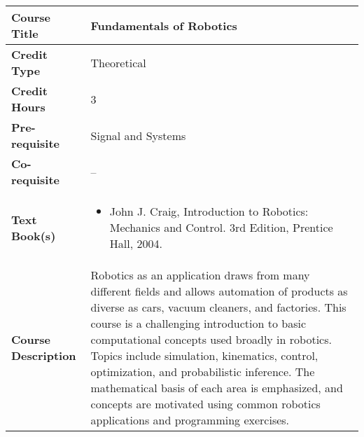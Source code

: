 \documentclass[11pt]{article}
\begin{document}
\begin{table}[h!]
\begin{tabular}{|l|l|}
\hline
\textbf{Course Title}       &  Fundamentals of Robotics \\ \hline
\textbf{Credit Type}        &  Theoretical \\ \hline
\textbf{Credit Hours}       &  3 \\ \hline
\textbf{Pre-requisite}       & Signal and Systems \\ \hline
\textbf{Co-requisite}       &  -- \\ \hline
\textbf{Text Book(s)}       & \begin{minipage}{.70\textwidth}
\begin{itemize} \itemsep-0.4em
	\vspace{3mm}
	\item John J. Craig, Introduction to Robotics: Mechanics and Control. 3rd Edition, Prentice Hall, 2004.
	\vspace{3mm}
\end{itemize}
\end{minipage}\\ \hline
\textbf{Course Description} & \begin{minipage}{.70\textwidth}
\vspace{3mm}
Robotics as an application draws from many different fields and allows automation of products as diverse as cars, vacuum cleaners, and factories. This course is a challenging introduction to basic computational concepts used broadly in robotics. Topics include simulation, kinematics, control, optimization, and probabilistic inference. The mathematical basis of each area is emphasized, and concepts are motivated using common robotics applications and programming exercises.
\vspace{3mm}
\end{minipage} \\ \hline
\end{tabular}
\end{table}
\end{document}
